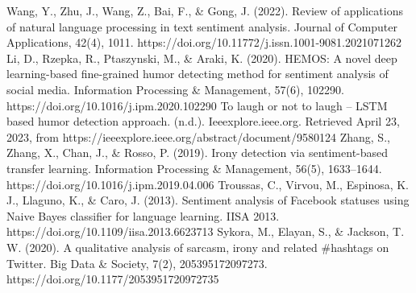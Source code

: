 \documentclass[a4paper]{article}
\begin{document}
\begin{thebibliography}{}
    Wang, Y., Zhu, J., Wang, Z., Bai, F., \& Gong, J. (2022). Review of applications of natural language processing in text sentiment analysis. Journal of Computer Applications, 42(4), 1011. https://doi.org/10.11772/j.issn.1001-9081.2021071262
    Li, D., Rzepka, R., Ptaszynski, M., \& Araki, K. (2020). HEMOS: A novel deep learning-based fine-grained humor detecting method for sentiment analysis of social media. Information Processing \& Management, 57(6), 102290. https://doi.org/10.1016/j.ipm.2020.102290
    To laugh or not to laugh – LSTM based humor detection approach. (n.d.). Ieeexplore.ieee.org. Retrieved April 23, 2023, from https://ieeexplore.ieee.org/abstract/document/9580124
    Zhang, S., Zhang, X., Chan, J., \& Rosso, P. (2019). Irony detection via sentiment-based transfer learning. Information Processing \& Management, 56(5), 1633–1644. https://doi.org/10.1016/j.ipm.2019.04.006
    Troussas, C., Virvou, M., Espinosa, K. J., Llaguno, K., \& Caro, J. (2013). Sentiment analysis of Facebook statuses using Naive Bayes classifier for language learning. IISA 2013. https://doi.org/10.1109/iisa.2013.6623713
    Sykora, M., Elayan, S., \& Jackson, T. W. (2020). A qualitative analysis of sarcasm, irony and related \#hashtags on Twitter. Big Data \& Society, 7(2), 205395172097273. https://doi.org/10.1177/2053951720972735
\end{thebibliography}
\end{document}
